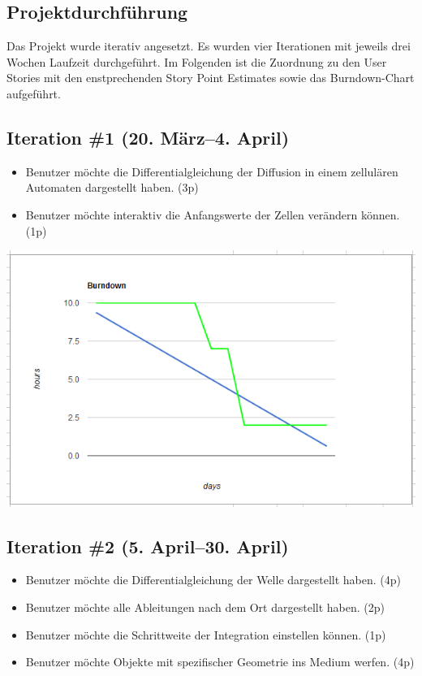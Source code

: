 \documentclass[11pt]{report} %
\theoremstyle{definition}
\begin{document}
\begin{appendix}

\chapter{Projektdurchführung}

Das Projekt wurde iterativ angesetzt. Es wurden vier Iterationen mit jeweils drei Wochen Laufzeit durchgeführt. Im Folgenden ist die Zuordnung zu den User Stories mit den enstprechenden Story Point Estimates sowie das Burndown-Chart aufgeführt.

\section{Iteration \#1 (20. März--4. April)}
\begin{itemize}
\item Benutzer möchte die Differentialgleichung der Diffusion in einem zellulären Automaten dargestellt haben. (3p) 
\item Benutzer möchte interaktiv die Anfangswerte der Zellen verändern können. (1p)
\end{itemize}

\includegraphics[scale=0.7]{burndowns/one.png}

\section{Iteration \#2 (5. April--30. April)}

\begin{itemize}
\item Benutzer möchte die Differentialgleichung der Welle dargestellt haben. (4p) 
\item Benutzer möchte alle Ableitungen nach dem Ort dargestellt haben. (2p) 
\item Benutzer möchte die Schrittweite der Integration einstellen können. (1p) 
\item Benutzer möchte Objekte mit spezifischer Geometrie ins Medium werfen. (4p)
\end{itemize}


\end{appendix}
\end{document}
